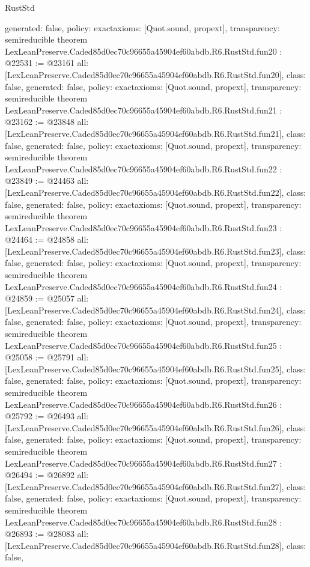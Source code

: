 \begin{lexlean}{RustStd}
\begin{coremodule}
{  generated: false,
  policy: exact{axioms: [Quot.sound, propext]},
  transparency: semireducible
}
theorem LexLeanPreserve.Caded85d0ec70c96655a45904ef60abdb.R6.RustStd.fun20 : @22531 := @23161 {
  all: [LexLeanPreserve.Caded85d0ec70c96655a45904ef60abdb.R6.RustStd.fun20],
  class: false,
  generated: false,
  policy: exact{axioms: [Quot.sound, propext]},
  transparency: semireducible
}
theorem LexLeanPreserve.Caded85d0ec70c96655a45904ef60abdb.R6.RustStd.fun21 : @23162 := @23848 {
  all: [LexLeanPreserve.Caded85d0ec70c96655a45904ef60abdb.R6.RustStd.fun21],
  class: false,
  generated: false,
  policy: exact{axioms: [Quot.sound, propext]},
  transparency: semireducible
}
theorem LexLeanPreserve.Caded85d0ec70c96655a45904ef60abdb.R6.RustStd.fun22 : @23849 := @24463 {
  all: [LexLeanPreserve.Caded85d0ec70c96655a45904ef60abdb.R6.RustStd.fun22],
  class: false,
  generated: false,
  policy: exact{axioms: [Quot.sound, propext]},
  transparency: semireducible
}
theorem LexLeanPreserve.Caded85d0ec70c96655a45904ef60abdb.R6.RustStd.fun23 : @24464 := @24858 {
  all: [LexLeanPreserve.Caded85d0ec70c96655a45904ef60abdb.R6.RustStd.fun23],
  class: false,
  generated: false,
  policy: exact{axioms: [Quot.sound, propext]},
  transparency: semireducible
}
theorem LexLeanPreserve.Caded85d0ec70c96655a45904ef60abdb.R6.RustStd.fun24 : @24859 := @25057 {
  all: [LexLeanPreserve.Caded85d0ec70c96655a45904ef60abdb.R6.RustStd.fun24],
  class: false,
  generated: false,
  policy: exact{axioms: [Quot.sound, propext]},
  transparency: semireducible
}
theorem LexLeanPreserve.Caded85d0ec70c96655a45904ef60abdb.R6.RustStd.fun25 : @25058 := @25791 {
  all: [LexLeanPreserve.Caded85d0ec70c96655a45904ef60abdb.R6.RustStd.fun25],
  class: false,
  generated: false,
  policy: exact{axioms: [Quot.sound, propext]},
  transparency: semireducible
}
theorem LexLeanPreserve.Caded85d0ec70c96655a45904ef60abdb.R6.RustStd.fun26 : @25792 := @26493 {
  all: [LexLeanPreserve.Caded85d0ec70c96655a45904ef60abdb.R6.RustStd.fun26],
  class: false,
  generated: false,
  policy: exact{axioms: [Quot.sound, propext]},
  transparency: semireducible
}
theorem LexLeanPreserve.Caded85d0ec70c96655a45904ef60abdb.R6.RustStd.fun27 : @26494 := @26892 {
  all: [LexLeanPreserve.Caded85d0ec70c96655a45904ef60abdb.R6.RustStd.fun27],
  class: false,
  generated: false,
  policy: exact{axioms: [Quot.sound, propext]},
  transparency: semireducible
}
theorem LexLeanPreserve.Caded85d0ec70c96655a45904ef60abdb.R6.RustStd.fun28 : @26893 := @28083 {
  all: [LexLeanPreserve.Caded85d0ec70c96655a45904ef60abdb.R6.RustStd.fun28],
  class: false,
}
\end{coremodule}
\end{lexlean}
